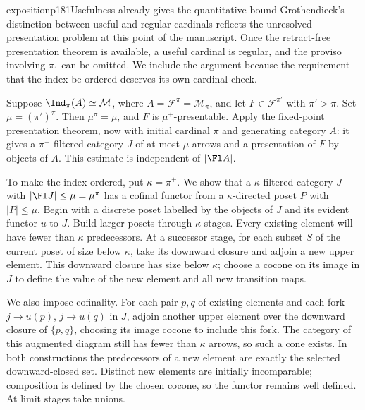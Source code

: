 \begin{dcomment}{exposition}{p181}{Usefulness already gives the quantitative bound}
Grothendieck's distinction between useful and regular cardinals reflects the unresolved presentation problem at this point of the manuscript. Once the retract-free presentation theorem is available, a useful cardinal is regular, and the proviso involving $\pi_1$ can be omitted. We include the argument because the requirement that the index be ordered deserves its own cardinal check.

Suppose $\Ind_\pi(A)\simeq\mathcal M$, where $A=\mathcal F^\pi=\mathcal M_\pi$, and let $F\in\mathcal F^{\pi'}$ with $\pi'>\pi$. Set $\mu=(\pi')^\pi$. Then $\mu^\pi=\mu$, and $F$ is $\mu^+$-presentable. Apply the fixed-point presentation theorem, now with initial cardinal $\pi$ and generating category $A$: it gives a $\pi^+$-filtered category $J$ of at most $\mu$ arrows and a presentation of $F$ by objects of $A$. This estimate is independent of $|\Fl A|$.

To make the index ordered, put $\kappa=\pi^+$. We show that a $\kappa$-filtered category $J$ with $|\Fl J|\leq\mu=\mu^\pi$ has a cofinal functor from a $\kappa$-directed poset $P$ with $|P|\leq\mu$. Begin with a discrete poset labelled by the objects of $J$ and its evident functor $u$ to $J$. Build larger posets through $\kappa$ stages. Every existing element will have fewer than $\kappa$ predecessors. At a successor stage, for each subset $S$ of the current poset of size below $\kappa$, take its downward closure and adjoin a new upper element. This downward closure has size below $\kappa$; choose a cocone on its image in $J$ to define the value of the new element and all new transition maps.

We also impose cofinality. For each pair $p,q$ of existing elements and each fork $j\to u(p)$, $j\to u(q)$ in $J$, adjoin another upper element over the downward closure of $\{p,q\}$, choosing its image cocone to include this fork. The category of this augmented diagram still has fewer than $\kappa$ arrows, so such a cone exists. In both constructions the predecessors of a new element are exactly the selected downward-closed set. Distinct new elements are initially incomparable; composition is defined by the chosen cocone, so the functor remains well defined. At limit stages take unions.


\end{dcomment}
